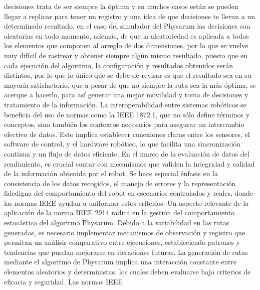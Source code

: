         decisiones trata de ser siempre la \'optima y en muchos casos
        est\'an se pueden llegar a replicar para tener un registro y una
        idea de que decisiones te llevan a un determinado resultado,
        en el caso del simulador del Physarum las decisiones son
        aleatorias en todo momento, adem\'as, de que la aleatoriedad
        es aplicada a todos los elementos que componen al arreglo
        de dos dimensiones, por lo que se vuelve muy dif\'icil de
        rastrear y obtener siempre alg\'un mismo resultado, puesto
        que en cada ejecuci\'on del algoritmo, la configuraci\'on y
        resultados obtenidos ser\'an distintos, por lo que lo \'unico que 
        se debe de revisar es que el resultado sea en su mayor\'ia
        satisfactorio, que a pesar de que no siempre la ruta sea la
        m\'as \'optima, se acerque a hacerlo, para as\'i generar una mejor
        movilidad y toma de decisiones y tratamiento de la
        informaci\'on.
    \vskip 0.5cm
    La interoperabilidad entre sistemas rob\'oticos se beneficia 
        del uso de normas como la IEEE 1872.1, que no s\'olo define 
        t\'erminos y conceptos, sino tambi\'en los contextos necesarios para 
        asegurar un intercambio efectivo de datos. Esto implica establecer 
        conexiones claras entre los sensores, el software de control, y el
        hardware rob\'otico, lo que facilita una sincronizaci\'on continua y un flujo de datos eficiente.
    \vskip 0.5cm
    En el marco de la evaluaci\'on de datos del rendimiento, es crucial contar con mecanismos que validen la 
        integridad y calidad de la informaci\'on obtenida por el robot. Se hace especial \'enfasis en la 
        consistencia de los datos recogidos, el manejo de errores y la representaci\'on fidedigna del 
        comportamiento del robot en escenarios controlados y reales, donde las normas IEEE ayudan a uniformar estos criterios.
    \vskip 0.5cm
    Un aspecto relevante de la aplicaci\'on de la norma IEEE 2914 radica en la gesti\'on del 
        comportamiento estoc\'astico del algoritmo Physarum. Debido a la variabilidad en las rutas generadas, 
        es necesario implementar mecanismos de observaci\'on y registro que permitan un an\'alisis comparativo 
        entre ejecuciones, estableciendo patrones y tendencias que puedan mejorarse en iteraciones futuras.
    \vskip 0.5cm
    La generaci\'on de rutas mediante el algoritmo de Physarum implica una interacci\'on constante entre elementos 
        aleatorios y deterministas, los cuales deben evaluarse bajo criterios de eficacia y seguridad. Las normas IEEE 
